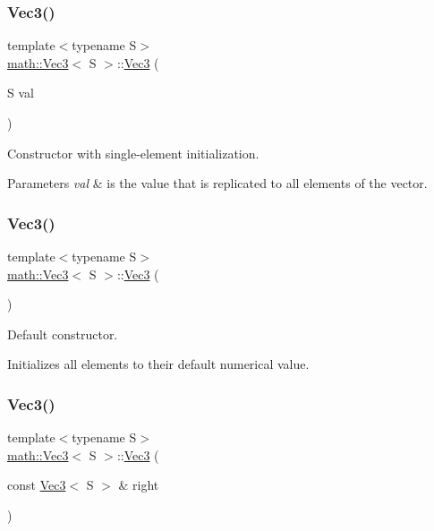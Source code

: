 \subsubsection{\texorpdfstring{Vec3()}{Vec3()}\hspace{0.1cm}{\footnotesize\ttfamily [2/4]}}
{\footnotesize\ttfamily template$<$typename S$>$ \\
\hyperlink{classmath_1_1_vec3}{math\+::\+Vec3}$<$ S $>$\+::\hyperlink{classmath_1_1_vec3}{Vec3} (\begin{DoxyParamCaption}\item[{S}]{val }\end{DoxyParamCaption})\hspace{0.3cm}{\ttfamily [inline]}}

Constructor with single-\/element initialization.


\begin{DoxyParams}{Parameters}
{\em val} & is the value that is replicated to all elements of the vector. \\
\hline
\end{DoxyParams}
\mbox{\label{classmath_1_1_vec3_a0eaf2f3a472502f1374a7f1118d7e459}} 
\subsubsection{\texorpdfstring{Vec3()}{Vec3()}\hspace{0.1cm}{\footnotesize\ttfamily [3/4]}}
{\footnotesize\ttfamily template$<$typename S$>$ \\
\hyperlink{classmath_1_1_vec3}{math\+::\+Vec3}$<$ S $>$\+::\hyperlink{classmath_1_1_vec3}{Vec3} (\begin{DoxyParamCaption}{ }\end{DoxyParamCaption})\hspace{0.3cm}{\ttfamily [inline]}}

Default constructor.

Initializes all elements to their default numerical value. \mbox{\label{classmath_1_1_vec3_a02c4f66911fc141e48d521a9a6cd9de4}} 
\subsubsection{\texorpdfstring{Vec3()}{Vec3()}\hspace{0.1cm}{\footnotesize\ttfamily [4/4]}}
{\footnotesize\ttfamily template$<$typename S$>$ \\
\hyperlink{classmath_1_1_vec3}{math\+::\+Vec3}$<$ S $>$\+::\hyperlink{classmath_1_1_vec3}{Vec3} (\begin{DoxyParamCaption}\item[{const \hyperlink{classmath_1_1_vec3}{Vec3}$<$ S $>$ \&}]{right }\end{DoxyParamCaption})\hspace{0.3cm}{\ttfamily [inline]}}

